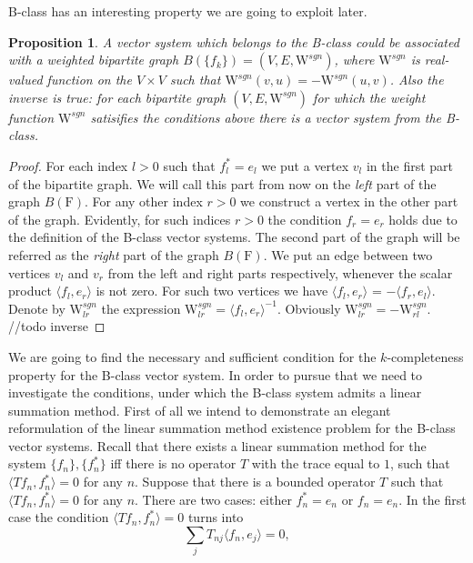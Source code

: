 \documentclass[12pt]{article}
\newtheorem{prop}{Proposition}
\theoremstyle{definition}
\newcommand{\fsys}{\mathrm{F}}
\newcommand{\sgnwt}{\mathrm{W}^{sgn}}
\numberwithin{remark}{section}
\numberwithin{theorem}{section}
\numberwithin{prop}{section}
\numberwithin{equation}{section}
\numberwithin{lemma}{section}
\numberwithin{prop_under_lemma}{lemma}
\begin{document}
    B-class has an interesting property we are going to exploit later.
    \begin{prop}
        A vector system which belongs to the B-class could be associated with a 
        weighted bipartite graph $B(\{f_k\}) = (V, E, \sgnwt)$, where $\sgnwt$ is real-valued function on the $V\times V$ such that
        $\sgnwt(v, u) = -\sgnwt(u, v)$.
        Also the inverse is true: for each bipartite graph $(V, E, \sgnwt)$ for which the weight function
        $\sgnwt$ satisifies the conditions above there is a vector system from the B-class.
    \end{prop}
    \begin{proof}
        For each index $l > 0$ such that $f^*_l = e_l$ we put a vertex $v_l$ in the first part of the bipartite graph.
        We will call this part from now on the \textit{left} part of the graph $B(\fsys)$.
        For any other index $r > 0$ we construct a vertex in the other part of the graph.
        Evidently, for such indices $r > 0$ the condition $f_r = e_r$ holds due to the definition of the B-class vector systems.
        The second part of the graph will be referred as the \textit{right} part of the graph $B(\fsys)$.
        We put an edge between two vertices $v_l$ and $v_r$ from the left and right parts respectively,
        whenever the scalar product $\langle f_l, e_r \rangle$ is not zero.
        For such two vertices we have $\langle f_l, e_r \rangle$ = $-\langle f_r, e_l \rangle$.
        Denote by $\sgnwt_{lr}$ the expression $\sgnwt_{lr} = \langle f_l, e_r \rangle^{-1}$.
        Obviously $\sgnwt_{lr} = -\sgnwt_{rl}$.
        //todo inverse
    \end{proof}
    We are going to find the necessary and sufficient condition for the $k$-completeness property for the B-class vector system.
    In order to pursue that we need to investigate the conditions, under which the B-class system admits a linear summation method.
    First of all we intend to demonstrate an elegant reformulation of the linear summation method existence problem for
    the B-class vector systems.
    Recall that there exists a linear summation method for the system $\{f_n\}, \{f^*_n\}$
    iff there is no operator $T$ with the trace equal to $1$, such that $\langle Tf_n, f_n^*\rangle = 0$ for any $n$.
    Suppose that there is a bounded operator $T$ such that $\langle Tf_n, f_n^*\rangle = 0$ for any $n$.
    There are two cases: either $f^*_n = e_n$ or $f_n = e_n$.
    In the first case the condition $\langle Tf_n, f_n^*\rangle = 0$ turns into
    \begin{equation}
        \label{left-eqn}
        \sum_j T_{nj} \langle f_n, e_j \rangle = 0,
    \end{equation}
\end{document}
